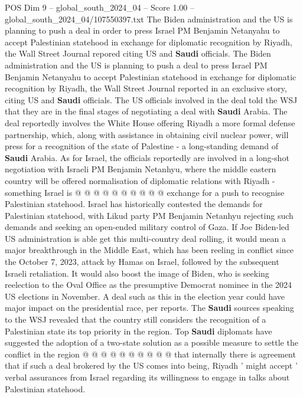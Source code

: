 \begin{textsample}{POS Dim 9 – global\_south\_2024\_04 – Score 1.00 – global\_south\_2024\_04/107550397.txt}  \label{ex:f9_pos_118}
The Biden administration and the US is planning to push a deal in order to press Israel PM Benjamin Netanyahu to accept Palestinian statehood in exchange for diplomatic recognition by Riyadh, the Wall Street Journal repored citing US and \textbf{Saudi} officials.
The Biden administration and the US is planning to push a deal to press Israel PM Benjamin Netanyahu to accept Palestinian statehood in exchange for diplomatic recognition by Riyadh, the Wall Street Journal reported in an exclusive story, citing US and \textbf{Saudi} officials.
The US officials involved in the deal told the WSJ that they are in the final stages of negotiating a deal with \textbf{Saudi} Arabia.
The deal reportedly involves the White House offering Riyadh a more formal defense partnership, which, along with assistance in obtaining civil nuclear power, will press for a recognition of the state of Palestine - a long-standing demand of \textbf{Saudi} Arabia.
As for Israel, the officials reportedly are involved in a long-shot negotiation with Israeli PM Benjamin Netanhyu, where the middle eastern country will be offered normalisation of diplomatic relations with Riyadh - something Israel is @ @ @ @ @ @ @ @ @ @ exchange for a push to recognise Palestinian statehood.
Israel has historically contested the demands for Palestinian statehood, with Likud party PM Benjamin Netanhyu rejecting such demands and seeking an open-ended military control of Gaza.
If Joe Biden-led US administration is able get this multi-country deal rolling, it would mean a major breakthrough in the Middle East, which has been reeling in conflict since the October 7, 2023, attack by Hamas on Israel, followed by the subsequent Israeli retaliation.
It would also boost the image of Biden, who is seeking reelection to the Oval Office as the presumptive Democrat nominee in the 2024 US elections in November.
A deal such as this in the election year could have major impact on the presidential race, per reports.
The \textbf{Saudi} sources speaking to the WSJ revealed that the country still considers the recognition of a Palestinian state its top priority in the region.
Top \textbf{Saudi} diplomats have suggested the adoption of a two-state solution as a possible measure to settle the conflict in the region @ @ @ @ @ @ @ @ @ @ that internally there is agreement that if such a deal brokered by the US comes into being, Riyadh ' might accept ' verbal assurances from Israel regarding its willingness to engage in talks about Palestinian statehood.

\end{textsample}

